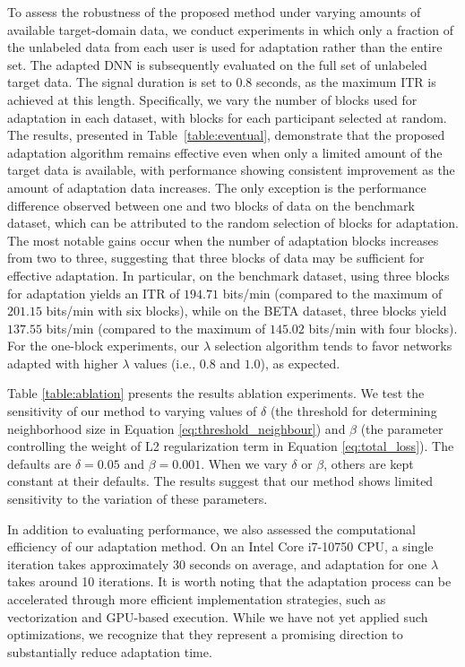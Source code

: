 \documentclass[12pt]{iopart}
\begin{document}
To assess the robustness of the proposed method under varying amounts of available target-domain data, we conduct experiments in which only a fraction of the unlabeled data from each user is used for adaptation rather than the entire set. The adapted DNN is subsequently evaluated on the full set of unlabeled target data. The signal duration is set to 0.8 seconds, as the maximum ITR is achieved at this length. Specifically, we vary the number of blocks used for adaptation in each dataset, with blocks for each participant selected at random. The results, presented in Table~\ref{table:eventual}, demonstrate that the proposed adaptation algorithm remains effective even when only a limited amount of the target data is available, with performance showing consistent improvement as the amount of adaptation data increases. {The only exception is the performance difference observed between one and two blocks of data on the benchmark dataset, which can be attributed to the random selection of blocks for adaptation.} The most notable gains occur when the number of adaptation blocks increases from two to three, suggesting that three blocks of data may be sufficient for effective adaptation. In particular, on the benchmark dataset, using three blocks for adaptation yields an ITR of $194.71$ bits/min (compared to the maximum of $201.15$ bits/min with six blocks), while on the BETA dataset, three blocks yield $137.55$ bits/min (compared to the maximum of $145.02$ bits/min with four blocks). For the one-block experiments, our $\lambda$ selection algorithm tends to favor networks adapted with higher $\lambda$ values (i.e., $0.8$ and $1.0$), as expected.

{Table \ref{table:ablation} presents the results ablation experiments. We test the sensitivity of our method to varying values of $\delta$ (the threshold for determining neighborhood size in Equation \ref{eq:threshold_neighbour}) and $\beta$ (the parameter controlling the weight of L2 regularization term in Equation \ref{eq:total_loss}). The defaults are $\delta=0.05$ and $\beta=0.001$. When we vary $\delta$ or $\beta$, others are kept constant at their defaults. The results suggest that our method shows limited sensitivity to the variation of these parameters.}

In addition to evaluating performance, we also assessed the computational efficiency of our adaptation method. On an Intel Core i7-10750 CPU, a single iteration takes approximately 30 seconds on average, and adaptation for one $\lambda$ takes around 10 iterations. {It is worth noting that the adaptation process can be accelerated through more efficient implementation strategies, such as vectorization and GPU-based execution. While we have not yet applied such optimizations, we recognize that they represent a promising direction to substantially reduce adaptation time.}
\end{document}
